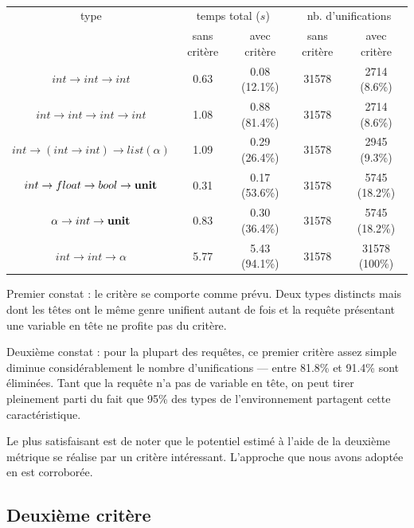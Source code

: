 \documentclass[a4paper]{report}
\theoremstyle{definition}
\begin{document}
\begin{table}[h]
  \centering
  \begin{tabular}{|*{5}{c|}}
    \hline
      type &
      \multicolumn{2}{c|}{temps total ($s$)} &
      \multicolumn{2}{c|}{nb. d'unifications}
    \\
    \cline{2-5}
      &
      sans critère & avec critère &
      sans critère & avec critère
    \\
    \hline
      $int \rightarrow int \rightarrow int$ &
      0.63 & 0.08 (12.1\%) &
      31578 & 2714 (8.6\%)
    \\
      $int \rightarrow int \rightarrow int \rightarrow int$ &
      1.08 & 0.88 (81.4\%) &
      31578 & 2714 (8.6\%)
    \\
      $int \rightarrow (int \rightarrow int) \rightarrow list (\alpha)$ &
      1.09 & 0.29 (26.4\%) &
      31578 & 2945 (9.3\%)
    \\
      $int \rightarrow float \rightarrow bool \rightarrow \bold{unit}$ &
      0.31 & 0.17 (53.6\%) &
      31578 & 5745 (18.2\%)
    \\
      $\alpha \rightarrow int \rightarrow \bold{unit}$ &
      0.83 & 0.30 (36.4\%) &
      31578 & 5745 (18.2\%)
    \\
      $int \rightarrow int \rightarrow \alpha$ &
      5.77 & 5.43 (94.1\%) &
      31578 & 31578 (100\%)
    \\
    \hline
  \end{tabular}
  \caption{\label{tab_apport1}}
\end{table}

Premier constat : le critère se comporte comme prévu. Deux types distincts mais dont les têtes ont le même genre unifient autant de fois et la requête présentant une variable en tête ne profite pas du critère.

Deuxième constat : pour la plupart des requêtes, ce premier critère assez simple diminue considérablement le nombre d'unifications — entre 81.8\% et 91.4\% sont éliminées. Tant que la requête n'a pas de variable en tête, on peut tirer pleinement parti du fait que 95\% des types de l'environnement partagent cette caractéristique.

Le plus satisfaisant est de noter que le potentiel estimé à l'aide de la deuxième métrique se réalise par un critère intéressant. L'approche que nous avons adoptée en est corroborée.


\subsection{Deuxième critère}
\end{document}
